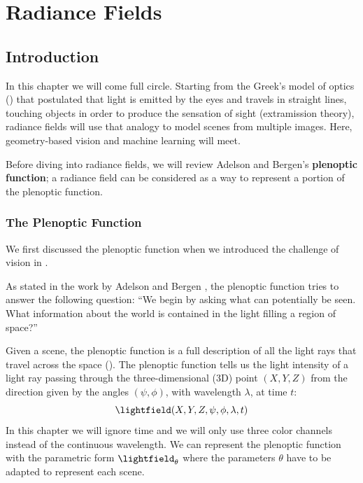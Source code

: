
\chapter{Radiance Fields}
\label{chapter:nerfs}


\section{Introduction}


In this chapter we will come full circle. Starting from the Greek's model of optics (\chap{\ref{chap:challenge_of_vision}}) that postulated that light is emitted by the eyes and travels in straight lines, touching objects in order to produce the sensation of sight (extramission theory), radiance fields will use that analogy to model scenes from multiple images. Here, geometry-based vision and machine learning will meet. 

Before diving into radiance fields, we will review Adelson and Bergen's \textbf{plenoptic function}; a radiance field can be considered as a way to represent a portion of the plenoptic function.%

\subsection{The Plenoptic Function}

We first discussed the plenoptic function when we introduced the challenge of vision in \chap{\ref{chap:challenge_of_vision}}.

As stated in the work by Adelson and Bergen \cite{Adelson91}, the plenoptic function tries to answer the following question: ``We begin by asking what can potentially be seen. What
information about the world is contained in the light
filling a region of space?''


Given a scene, the plenoptic function is a full description of all the light rays that travel across the space (\fig{\ref{fig:nerfs:plenoptic_function}}). The plenoptic function tells us the light intensity of a light ray passing through the three-dimensional (3D) point $(X, Y, Z)$ from the direction given by the angles $(\psi, \phi)$, with wavelength $\lambda$, at time $t$:
\begin{equation}
\lightfield (X, Y, Z, \psi, \phi, \lambda, t)
\end{equation}
In this chapter we will ignore time and we will only use three color channels instead of the continuous wavelength. We can represent the plenoptic function with the parametric form $\lightfield_{\theta}$ where the parameters $\theta$ have to be adapted to represent each scene. 

